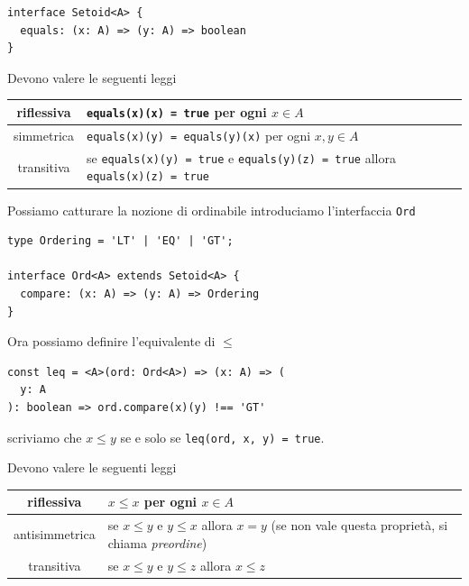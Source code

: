 \documentclass[12pt]{article}
\begin{document}
\begin{verbatim}
interface Setoid<A> {
  equals: (x: A) => (y: A) => boolean
}
\end{verbatim}

Devono valere le seguenti leggi

\begin{center}
\bgroup
\def\arraystretch{1.5}
\begin{tabular}{ |c|p{10cm}| }
\hline
riflessiva & \texttt{equals(x)(x) = true} per ogni $x \in A$ \\
\hline
simmetrica & \texttt{equals(x)(y) = equals(y)(x)} per ogni $x, y \in A$ \\
\hline
transitiva & se \texttt{equals(x)(y) = true} e \texttt{equals(y)(z) = true} allora \texttt{equals(x)(z) = true} \\
\hline
\end{tabular}
\egroup
\end{center}

Possiamo catturare la nozione di ordinabile introduciamo l'interfaccia \texttt{Ord}

\begin{verbatim}
type Ordering = 'LT' | 'EQ' | 'GT';

interface Ord<A> extends Setoid<A> {
  compare: (x: A) => (y: A) => Ordering
}
\end{verbatim}

Ora possiamo definire l'equivalente di $\leq$

\begin{verbatim}
const leq = <A>(ord: Ord<A>) => (x: A) => (
  y: A
): boolean => ord.compare(x)(y) !== 'GT'
\end{verbatim}

scriviamo che $x \leq y$ se e solo se \texttt{leq(ord, x, y) = true}.

Devono valere le seguenti leggi

\begin{center}
\bgroup
\def\arraystretch{1.5}
\begin{tabular}{ |c|p{10cm}| }
\hline
riflessiva & $x \leq x$ per ogni $x \in A$ \\
\hline
antisimmetrica & se $x \leq y$ e $y \leq x$ allora $x = y$ (se non vale questa proprietà, si chiama \emph{preordine}) \\
\hline
transitiva & se $x \leq y$ e $y \leq z$ allora $x \leq z$ \\
\hline
\end{tabular}
\egroup
\end{center}
\end{document}
